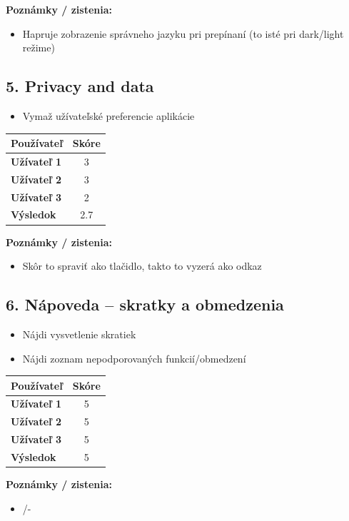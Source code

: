 \documentclass[a4paper,12pt]{article}
\begin{document}
\textbf{Poznámky / zistenia:}
\begin{itemize}
    \item Hapruje zobrazenie správneho jazyku pri prepínaní (to isté pri dark/light režime)
\end{itemize}

\subsection*{5. Privacy and data}
\begin{itemize}
    \item Vymaž užívateľské preferencie aplikácie 
\end{itemize}

\begin{longtable}{>{\bfseries}l c}
\toprule
Používateľ & Skóre \\
\midrule
Užívateľ 1 & 3 \\
Užívateľ 2 & 3 \\
Užívateľ 3 & 2 \\
Výsledok & 2.7 \\
\bottomrule
\end{longtable}

\textbf{Poznámky / zistenia:}
\begin{itemize}
    \item Skôr to spraviť ako tlačidlo, takto to vyzerá ako odkaz
\end{itemize}

\subsection*{6. Nápoveda – skratky a obmedzenia}
\begin{itemize}
    \item Nájdi vysvetlenie skratiek
    \item Nájdi zoznam nepodporovaných funkcií/obmedzení
\end{itemize}

\begin{longtable}{>{\bfseries}l c}
\toprule
Používateľ & Skóre \\
\midrule
Užívateľ 1 & 5 \\
Užívateľ 2 & 5 \\
Užívateľ 3 & 5 \\
Výsledok & 5 \\
\bottomrule
\end{longtable}

\textbf{Poznámky / zistenia:}
\begin{itemize}
    \item /-
\end{itemize}
\end{document}
